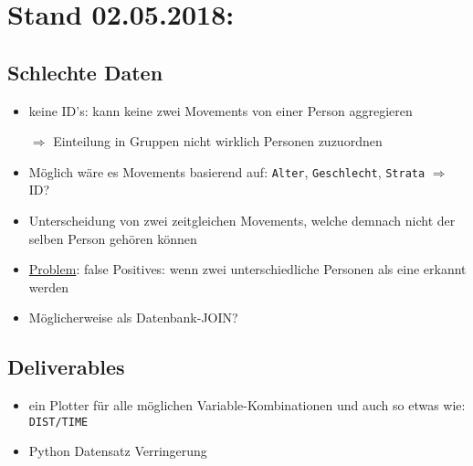 \documentclass[11pt]{article}
\begin{document}
\section*{Stand 02.05.2018:}
\subsection*{Schlechte Daten}
\begin{itemize}
	\item keine ID's: kann keine zwei Movements von einer Person aggregieren
	\item[$\Rightarrow$] Einteilung in Gruppen nicht wirklich Personen zuzuordnen
	\item[]
	\item Möglich wäre es Movements basierend auf: \texttt{Alter}, \texttt{Geschlecht}, \texttt{Strata} $\Rightarrow$ ID?
	\item Unterscheidung von zwei zeitgleichen Movements, welche demnach nicht der selben Person gehören können
	\item \underline{Problem}: false Positives: wenn zwei unterschiedliche Personen als eine erkannt werden
	\item Möglicherweise als Datenbank-JOIN?
\end{itemize}

\subsection*{Deliverables}
\begin{itemize}
	\item ein Plotter für alle möglichen Variable-Kombinationen und auch so etwas wie: \texttt{DIST/TIME}
	\item Python Datensatz Verringerung
\end{itemize}
\end{document}
